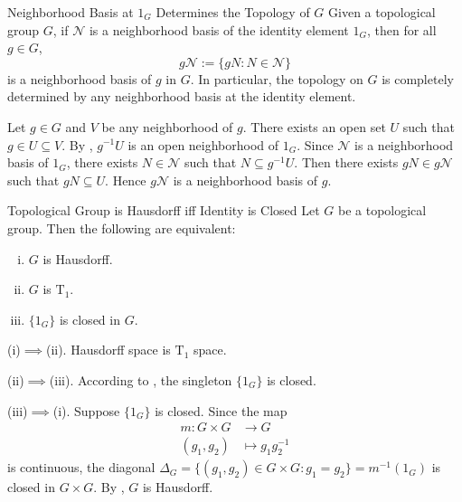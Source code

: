 \documentclass{report}
\begin{document}
\begin{proposition}{Neighborhood Basis at $1_G$ Determines the Topology of $G$}{}
	Given a topological group $G$, if $\mathcal{N}$ is a neighborhood basis of the identity element $1_G$, then for all $g \in G$,
	\[
		g \mathcal{N}:=\{g N: N \in \mathcal{N}\}
	\]
	is a neighborhood basis of $g$ in $G$. In particular, the topology on $G$ is completely determined by any neighborhood basis at the identity element.
\end{proposition}

\begin{prf}
	Let $g\in G$ and $V$ be any neighborhood of $g$. There exists an open set $U$ such that $g\in U\subseteq V$. By , $g^{-1} U$ is an open neighborhood of $1_G$. Since $\mathcal{N}$ is a neighborhood basis of $1_G$, there exists $N \in \mathcal{N}$ such that $N \subseteq g^{-1} U$. Then there exists $g N \in g \mathcal{N}$ such that $g N \subseteq U$. Hence $g \mathcal{N}$ is a neighborhood basis of $g$.
\end{prf}

\begin{proposition}{Topological Group is Hausdorff iff Identity is Closed}{}
	Let $G$ be a topological group. Then the following are equivalent:
	\begin{enumerate}[(i)]
		\item $G$ is Hausdorff.
		\item $G$ is $\mathrm{T}_1$.
		\item $\{1_G\}$ is closed in $G$.
	\end{enumerate}
\end{proposition}
\begin{prf}
	(i)$\implies$(ii). Hausdorff space is $\mathrm{T}_1$ space.

	(ii)$\implies$(iii). According to , the singleton $\{1_G\}$ is closed.
	
	(iii)$\implies$(i). Suppose $\{1_G\}$ is closed. Since the map 
	\begin{align*}
		m:G\times G & \longrightarrow G       \\
		(g_1,g_2)   & \longmapsto g_1g_2^{-1}
	\end{align*}
	is continuous, the diagonal $\Delta_G=\{(g_1,g_2)\in G\times G:g_1=g_2\}=m^{-1}(1_G)$ is closed in $G\times G$. By , $G$ is Hausdorff.
\end{prf}
\end{document}
